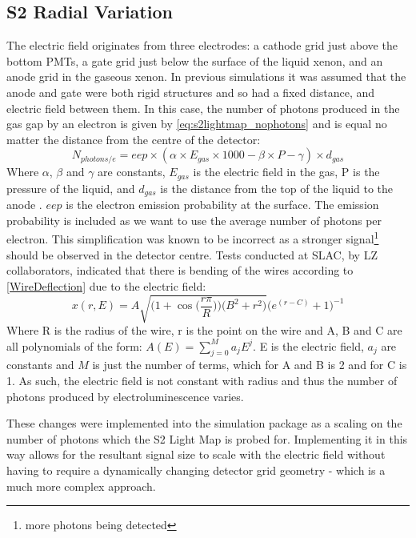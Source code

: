 \subsection{S2 Radial Variation} \label{sec:s2radialvariation}
\par
The electric field originates from three electrodes: a cathode grid just above the bottom PMTs, a gate grid just below the surface of the liquid xenon, and an anode grid in the gaseous xenon.
In previous simulations it was assumed that the anode and gate were both rigid structures and so had a fixed distance, and electric field between them.
In this case, the number of photons produced in the gas gap by an electron is given by \autoref{eq:s2lightmap_nophotons} and is equal no matter the distance from the centre of the detector:
\begin{equation}
    N_{photons/e} = eep \times (\alpha \times E_{gas} \times 1000 - \beta \times P - \gamma) \times d_{gas}
    \label{eq:s2lightmap_nophotons}
\end{equation}
Where $\alpha$, $\beta$ and $\gamma$ are constants, $E_{gas}$ is the electric field in the gas, P is the pressure of the liquid, and $d_{gas}$ is the distance from the top of the liquid to the anode \cite{NoPhotonsPerElectron}.
$eep$ is the electron emission probability at the surface.
The emission probability is included as we want to use the average number of photons per electron.
This simplification was known to be incorrect as a stronger signal\footnote{more photons being detected} should be observed in the detector centre.
Tests conducted at SLAC, by LZ collaborators, indicated that there is bending of the wires according to \autoref{WireDeflection} due to the electric field:
\begin{equation}
    x(r,E) = A \sqrt{ \bigg( 1 + \cos{ \Big( \frac{r \pi}{R} } \Big) \bigg) \bigg( B^2 + r^2 \bigg) } \bigg( e^{(r-C)} + 1 \bigg)^{-1} 
    \label{WireDeflection}
\end{equation}
Where R is the radius of the wire, r is the point on the wire and A, B and C are all polynomials of the form: $A(E) = \sum_{j=0}^{M} a_{j} E^{j}$. E is the electric field, $a_{j}$ are constants and $M$ is just the number of terms, which for A and B is 2 and for C is 1.
As such, the electric field is not constant with radius and thus the number of photons produced by electroluminescence varies.
\par
These changes were implemented into the simulation package as a scaling on the number of photons which the S2 Light Map is probed for.
Implementing it in this way allows for the resultant signal size to scale with the electric field without having to require a dynamically changing detector grid geometry - which is a much more complex approach.
